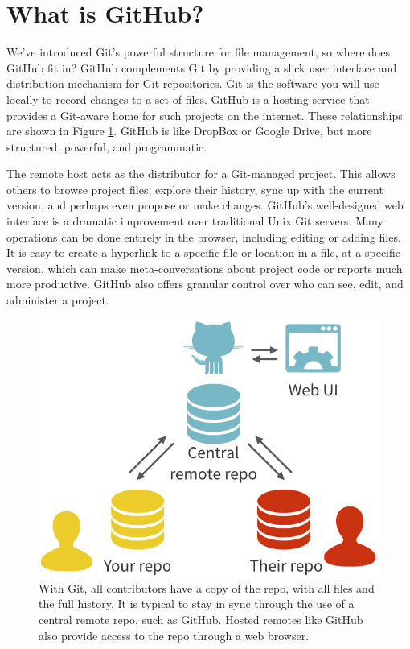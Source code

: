 \documentclass[12pt]{article}
\begin{document}
\section{What is GitHub?}\label{what-is-github}

We've introduced Git's powerful structure for file management, so where
does GitHub fit in? GitHub complements Git by providing a slick user
interface and distribution mechanism for Git repositories. Git is the
software you will use locally to record changes to a set of files.
GitHub is a hosting service that provides a Git-aware home for such
projects on the internet. These relationships are shown in Figure
\ref{fig:yours-theirs-github}. GitHub is like DropBox or Google Drive,
but more structured, powerful, and programmatic.

The remote host acts as the distributor for a Git-managed project. This
allows others to browse project files, explore their history, sync up
with the current version, and perhaps even propose or make changes.
GitHub's well-designed web interface is a dramatic improvement over
traditional Unix Git servers. Many operations can be done entirely in
the browser, including editing or adding files. It is easy to create a
hyperlink to a specific file or location in a file, at a specific
version, which can make meta-conversations about project code or reports
much more productive. GitHub also offers granular control over who can
see, edit, and administer a project.

\begin{figure}
\includegraphics[width=1\linewidth]{your-repo-their-repo-central-remote-repo} \caption{\label{fig:yours-theirs-github}With Git, all contributors have a copy of the repo, with all files and the full history. It is typical to stay in sync through the use of a central remote repo, such as GitHub. Hosted remotes like GitHub also provide access to the repo through a web browser.}\label{fig:yours-theirs-github}
\end{figure}
\end{document}
